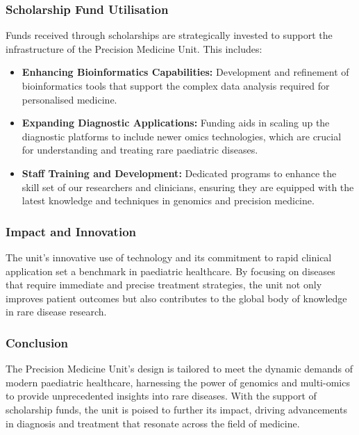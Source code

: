 \subsubsection*{Scholarship Fund Utilisation}
Funds received through scholarships are strategically invested to support the infrastructure of the Precision Medicine Unit. This includes:
\begin{itemize}
    \item \textbf{Enhancing Bioinformatics Capabilities:} Development and refinement of bioinformatics tools that support the complex data analysis required for personalised medicine.
    \item \textbf{Expanding Diagnostic Applications:} Funding aids in scaling up the diagnostic platforms to include newer omics technologies, which are crucial for understanding and treating rare paediatric diseases.
    \item \textbf{Staff Training and Development:} Dedicated programs to enhance the skill set of our researchers and clinicians, ensuring they are equipped with the latest knowledge and techniques in genomics and precision medicine.
\end{itemize}

\subsubsection*{Impact and Innovation}
The unit’s innovative use of technology and its commitment to rapid clinical application set a benchmark in paediatric healthcare. By focusing on diseases that require immediate and precise treatment strategies, the unit not only improves patient outcomes but also contributes to the global body of knowledge in rare disease research.

\subsubsection*{Conclusion}
The Precision Medicine Unit’s design is tailored to meet the dynamic demands of modern paediatric healthcare, harnessing the power of genomics and multi-omics to provide unprecedented insights into rare diseases. With the support of scholarship funds, the unit is poised to further its impact, driving advancements in diagnosis and treatment that resonate across the field of medicine.
